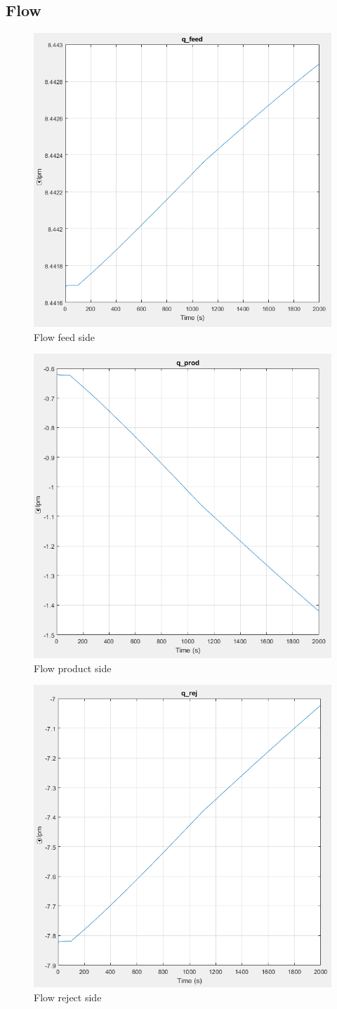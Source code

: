 \subsection{Flow}
\begin{figure}[h]
  \centering
  \includegraphics[width=0.5\linewidth]{q_feed.PNG}
  \caption{Flow feed side}
  \label{fig:qf}
\end{figure}
\begin{figure}[h]
  \centering
  \includegraphics[width=0.5\linewidth]{q_prod.PNG}
  \caption{Flow product side}
  \label{fig:qp}
\end{figure}
\begin{figure}[h]
  \centering
  \includegraphics[width=0.5\linewidth]{q_rej.PNG}
  \caption{Flow reject side}
  \label{fig:qrej}
\end{figure}

